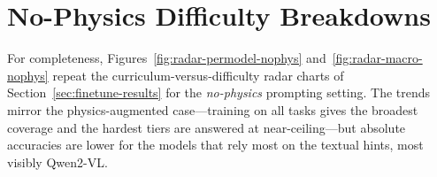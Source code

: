 \documentclass[conference]{IEEEtran}
\begin{document}














% 


\appendix
\section{No-Physics Difficulty Breakdowns}
\label{sec:appendix}

For completeness, Figures~\ref{fig:radar-permodel-nophys} and~\ref{fig:radar-macro-nophys} repeat the curriculum-versus-difficulty radar charts of Section~\ref{sec:finetune-results} for the \emph{no-physics} prompting setting. The trends mirror the physics-augmented case---training on all tasks gives the broadest coverage and the hardest tiers are answered at near-ceiling---but absolute accuracies are lower for the models that rely most on the textual hints, most visibly Qwen2-VL.
\end{document}
